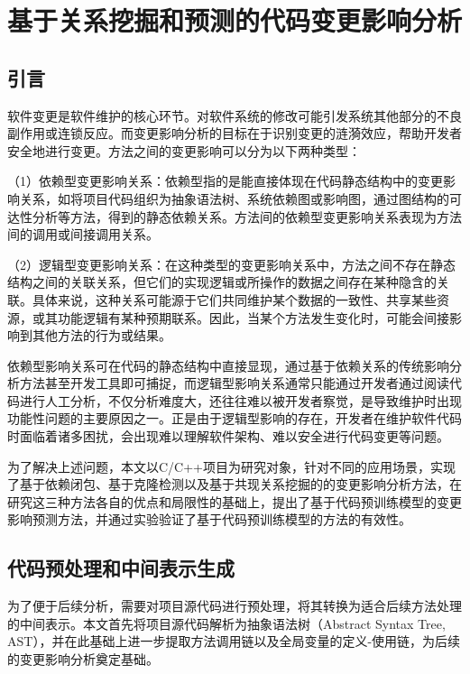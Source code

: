 
\chapter{基于关系挖掘和预测的代码变更影响分析}

\section{引言}

软件变更是软件维护的核心环节。对软件系统的修改可能引发系统其他部分的不良副作用或连锁反应。而变更影响分析的目标在于识别变更的涟漪效应，帮助开发者安全地进行变更。方法之间的变更影响可以分为以下两种类型：

（1）依赖型变更影响关系：依赖型指的是能直接体现在代码静态结构中的变更影响关系，如将项目代码组织为抽象语法树、系统依赖图或影响图，通过图结构的可达性分析等方法，得到的静态依赖关系。方法间的依赖型变更影响关系表现为方法间的调用或间接调用关系。

（2）逻辑型变更影响关系：在这种类型的变更影响关系中，方法之间不存在静态结构之间的关联关系，但它们的实现逻辑或所操作的数据之间存在某种隐含的关联。具体来说，这种关系可能源于它们共同维护某个数据的一致性、共享某些资源，或其功能逻辑有某种预期联系。因此，当某个方法发生变化时，可能会间接影响到其他方法的行为或结果。

依赖型影响关系可在代码的静态结构中直接显现，通过基于依赖关系的传统影响分析方法甚至开发工具即可捕捉，而逻辑型影响关系通常只能通过开发者通过阅读代码进行人工分析，不仅分析难度大，还往往难以被开发者察觉，是导致维护时出现功能性问题的主要原因之一。正是由于逻辑型影响的存在，开发者在维护软件代码时面临着诸多困扰，会出现难以理解软件架构、难以安全进行代码变更等问题。


为了解决上述问题，本文以C/C++项目为研究对象，针对不同的应用场景，实现了基于依赖闭包、基于克隆检测以及基于共现关系挖掘的的变更影响分析方法，在研究这三种方法各自的优点和局限性的基础上，提出了基于代码预训练模型的变更影响预测方法，并通过实验验证了基于代码预训练模型的方法的有效性。


\section{代码预处理和中间表示生成}

为了便于后续分析，需要对项目源代码进行预处理，将其转换为适合后续方法处理的中间表示。本文首先将项目源代码解析为抽象语法树（Abstract Syntax Tree, AST），并在此基础上进一步提取方法调用链以及全局变量的定义-使用链，为后续的变更影响分析奠定基础。

